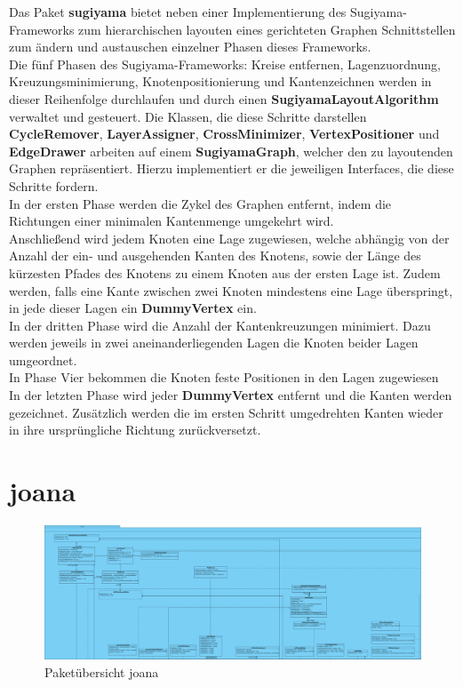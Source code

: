 Das Paket \textbf{sugiyama} bietet neben einer Implementierung des Sugiyama-Frameworks zum hierarchischen layouten eines gerichteten Graphen Schnittstellen zum ändern und austauschen einzelner Phasen dieses Frameworks.\\
Die fünf Phasen des Sugiyama-Frameworks: Kreise entfernen, Lagenzuordnung, Kreuzungsminimierung, Knotenpositionierung und Kantenzeichnen werden in dieser Reihenfolge durchlaufen und durch einen \textbf{SugiyamaLayoutAlgorithm} verwaltet und gesteuert. Die Klassen, die diese Schritte darstellen \textbf{CycleRemover}, \textbf{LayerAssigner}, \textbf{CrossMinimizer}, \textbf{VertexPositioner} und \textbf{EdgeDrawer} arbeiten auf einem \textbf{SugiyamaGraph}, welcher den zu layoutenden Graphen repräsentiert. Hierzu implementiert er die jeweiligen Interfaces, die diese Schritte fordern.\\
In der ersten Phase werden die Zykel des Graphen entfernt, indem die Richtungen einer minimalen Kantenmenge umgekehrt wird.\\
Anschließend wird jedem Knoten eine Lage zugewiesen, welche abhängig von der Anzahl der ein- und ausgehenden Kanten des Knotens, sowie der Länge des kürzesten Pfades des Knotens zu einem Knoten aus der ersten Lage ist. Zudem werden, falls eine Kante zwischen zwei Knoten mindestens eine Lage überspringt, in jede dieser Lagen ein \textbf{DummyVertex} ein.\\
In der dritten Phase wird die Anzahl der Kantenkreuzungen minimiert. Dazu werden jeweils in zwei aneinanderliegenden Lagen die Knoten beider Lagen umgeordnet.\\
In Phase Vier bekommen die Knoten feste Positionen in den Lagen zugewiesen\\
In der letzten Phase wird jeder \textbf{DummyVertex} entfernt und die Kanten werden gezeichnet. Zusätzlich werden die im ersten Schritt umgedrehten Kanten wieder in ihre ursprüngliche Richtung zurückversetzt.

\newpage

\section{joana}

\begin{figure}[hb]
  \centering
  \includegraphics[width=380pt]{resourcen/joana.png}
  \caption{Paketübersicht joana}
  \label{fig:packge_joana}
\end{figure}


